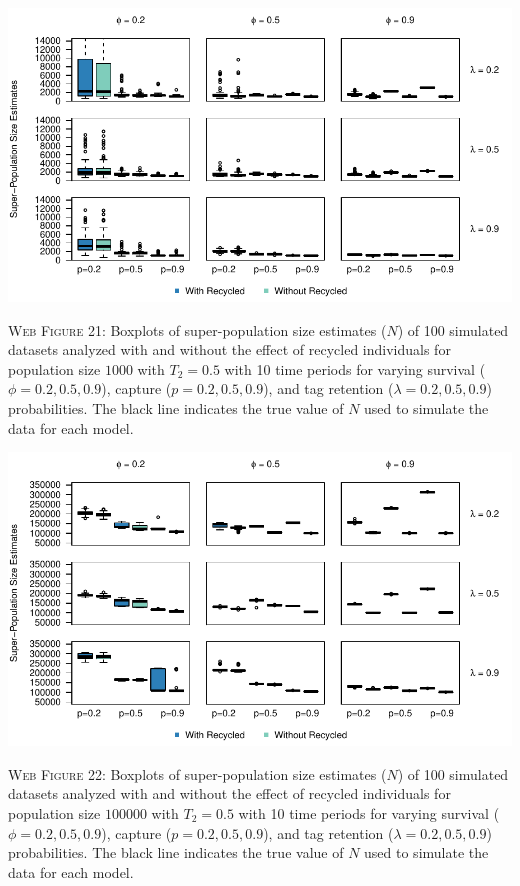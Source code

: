 \documentclass[]{article}
\begin{document}
\newpage

\includegraphics{Appendix_files/figure-latex/21_superN_GJSTL4-1.pdf}

\textsc{Web Figure 21:} Boxplots of super-population size estimates
(\(N\)) of 100 simulated datasets analyzed with and without the effect
of recycled individuals for population size \(1000\) with \(T_2=0.5\)
with 10 time periods for varying survival (\(\phi=0.2,0.5,0.9\)),
capture (\(p=0.2,0.5,0.9\)), and tag retention (\(\lambda=0.2,0.5,0.9\))
probabilities. The black line indicates the true value of \(N\) used to
simulate the data for each model.

\includegraphics{Appendix_files/figure-latex/22_superN_GJSTL3-1.pdf}

\textsc{Web Figure 22:} Boxplots of super-population size estimates
(\(N\)) of 100 simulated datasets analyzed with and without the effect
of recycled individuals for population size \(100000\) with \(T_2=0.5\)
with 10 time periods for varying survival (\(\phi=0.2,0.5,0.9\)),
capture (\(p=0.2,0.5,0.9\)), and tag retention (\(\lambda=0.2,0.5,0.9\))
probabilities. The black line indicates the true value of \(N\) used to
simulate the data for each model.
\end{document}
